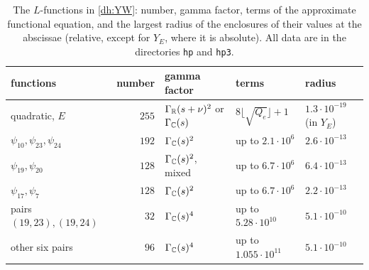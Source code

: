 \begin{table}[htbp]
\centering\small
\caption{The $L$-functions in \eqref{dh:YW}: number, gamma factor, terms of
the approximate functional equation, and the largest radius of the
enclosures of their values at the abscissae (relative, except for $Y_E$,
where it is absolute). All data are in the directories \texttt{hp} and
\texttt{hp3}.}
\label{lv:results}
\begin{tabular}{lrlll}
\toprule
functions & number & gamma factor & terms & radius\\
\midrule
quadratic, $E$ & $255$ & $\Gamma_\mathbb R(s+\nu)^2$ or $\Gamma_\mathbb C(s)$ & $8\lfloor\sqrt{Q_e}\rfloor+1$ & $1.3\cdot10^{-19}$ (in $Y_E$)\\
$\psi_{10},\psi_{23},\psi_{24}$ & $192$ & $\Gamma_\mathbb C(s)^2$ & up to $2.1\cdot10^6$ & $2.6\cdot10^{-13}$\\
$\psi_{19},\psi_{20}$ & $128$ & $\Gamma_\mathbb C(s)^2$, mixed & up to $6.7\cdot10^6$ & $6.4\cdot10^{-13}$\\
$\psi_{17},\psi_7$ & $128$ & $\Gamma_\mathbb C(s)^2$ & up to $6.7\cdot10^6$ & $2.2\cdot10^{-13}$\\
pairs $(19,23),(19,24)$ & $32$ & $\Gamma_\mathbb C(s)^4$ & up to $5.28\cdot10^{10}$ & $5.1\cdot10^{-10}$\\
other six pairs & $96$ & $\Gamma_\mathbb C(s)^4$ & up to $1.055\cdot10^{11}$ & $5.1\cdot10^{-10}$\\
\bottomrule
\end{tabular}
\end{table}
